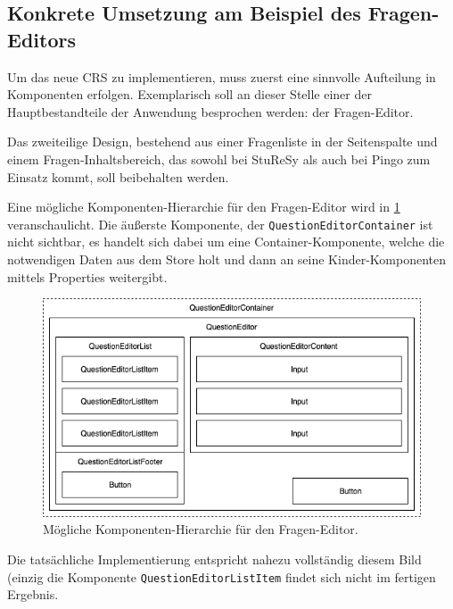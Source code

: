 \subsection{Konkrete Umsetzung am Beispiel des Fragen-Editors}
Um das neue CRS zu implementieren, muss zuerst eine sinnvolle Aufteilung in Komponenten erfolgen. Exemplarisch soll an dieser Stelle einer der Hauptbestandteile der Anwendung besprochen werden: der Fragen-Editor.

Das zweiteilige Design, bestehend aus einer Fragenliste in der Seitenspalte und einem Fragen-Inhaltsbereich, das sowohl bei StuReSy als auch bei Pingo zum Einsatz kommt, soll beibehalten werden.

Eine mögliche Komponenten-Hierarchie für den Fragen-Editor wird in \ref{Abbildung 4.1} veranschaulicht. Die äußerste Komponente, der \texttt{QuestionEditorContainer} ist nicht sichtbar, es handelt sich dabei um eine Container-Komponente, welche die notwendigen Daten aus dem Store holt und dann an seine Kinder-Komponenten mittels Properties weitergibt.

\begin{figure}[H]
    \includegraphics[width=12cm]{chapter/entwurf/Component_Hierarchy.png}
    \centering
    \caption{Mögliche Komponenten-Hierarchie für den Fragen-Editor.}
    \label{Abbildung 4.1}
\end{figure}

Die tatsächliche Implementierung entspricht nahezu vollständig diesem Bild (einzig die Komponente \texttt{QuestionEditorListItem} findet sich nicht im fertigen Ergebnis.

